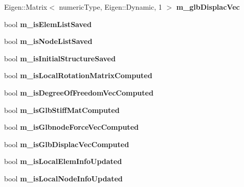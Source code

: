 \begin{DoxyCompactItemize}
\item 
\mbox{\label{classbase_structural_analysis_class_a9c92d5720fc03e77a2b30a8e5277aeba}} 
Eigen\+::\+Matrix$<$ numeric\+Type, Eigen\+::\+Dynamic, 1 $>$ {\bfseries m\+\_\+glb\+Displac\+Vec}
\item 
\mbox{\label{classbase_structural_analysis_class_a3497fd3dc60eb8cf056a3d3828000bb2}} 
bool {\bfseries m\+\_\+is\+Elem\+List\+Saved}
\item 
\mbox{\label{classbase_structural_analysis_class_a9a89aee1ea437bb8f1a633860b306633}} 
bool {\bfseries m\+\_\+is\+Node\+List\+Saved}
\item 
\mbox{\label{classbase_structural_analysis_class_aeda5815de358a24f99b194854252e94b}} 
bool {\bfseries m\+\_\+is\+Initial\+Structure\+Saved}
\item 
\mbox{\label{classbase_structural_analysis_class_ad5e1782b128ac071695aae4ee8d7d23a}} 
bool {\bfseries m\+\_\+is\+Local\+Rotation\+Matrix\+Computed}
\item 
\mbox{\label{classbase_structural_analysis_class_a60baf19b10caa39342408548d5a834ac}} 
bool {\bfseries m\+\_\+is\+Degree\+Of\+Freedom\+Vec\+Computed}
\item 
\mbox{\label{classbase_structural_analysis_class_af6d2f4bea68e4bd857a2ac6bea8194ec}} 
bool {\bfseries m\+\_\+is\+Glb\+Stiff\+Mat\+Computed}
\item 
\mbox{\label{classbase_structural_analysis_class_a779af0fab2226dacec87b0f6a05e1956}} 
bool {\bfseries m\+\_\+is\+Glbnode\+Force\+Vec\+Computed}
\item 
\mbox{\label{classbase_structural_analysis_class_a920c4ef5aedc3e9bf397c7d67786e696}} 
bool {\bfseries m\+\_\+is\+Glb\+Displac\+Vec\+Computed}
\item 
\mbox{\label{classbase_structural_analysis_class_ac89e923d65f5fc5f8e08d15bf5b65bb5}} 
bool {\bfseries m\+\_\+is\+Local\+Elem\+Info\+Updated}
\item 
\mbox{\label{classbase_structural_analysis_class_a5930a49c82de1cc5d03d0b44788f8af0}} 
bool {\bfseries m\+\_\+is\+Local\+Node\+Info\+Updated}
\end{DoxyCompactItemize}


